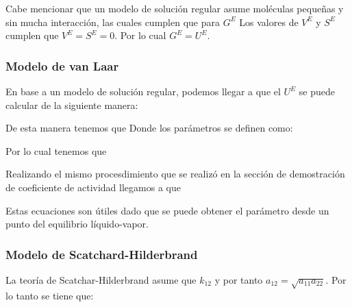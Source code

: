 Cabe mencionar que un modelo de solución regular asume moléculas pequeñas y sin mucha interacción, las cuales cumplen que para $G^{E}$
Los valores de $V^{E}$ y $S^{E}$ cumplen que $V^{E}=S^{E}=0$. Por lo cual $G^{E}=U^{E}$.

\subsubsection{Modelo de van Laar}

En base a un modelo de solución regular, podemos llegar a que el $U^{E}$ se puede calcular de la siguiente manera:


De esta manera tenemos que 
Donde los parámetros se definen como:


Por lo cual tenemos que 


Realizando el mismo procesdimiento que se realizó en la sección de demostración de coeficiente de actividad llegamos a que 

Estas ecuaciones son útiles dado que se puede obtener el parámetro desde un punto del equilibrio líquido-vapor.
\subsubsection{Modelo de Scatchard-Hilderbrand}

La teoría de Scatchar-Hilderbrand asume que $k_{12}$  y por tanto $a_{12}=\sqrt{a_{11}a_{22}}$. Por lo tanto se tiene que:

